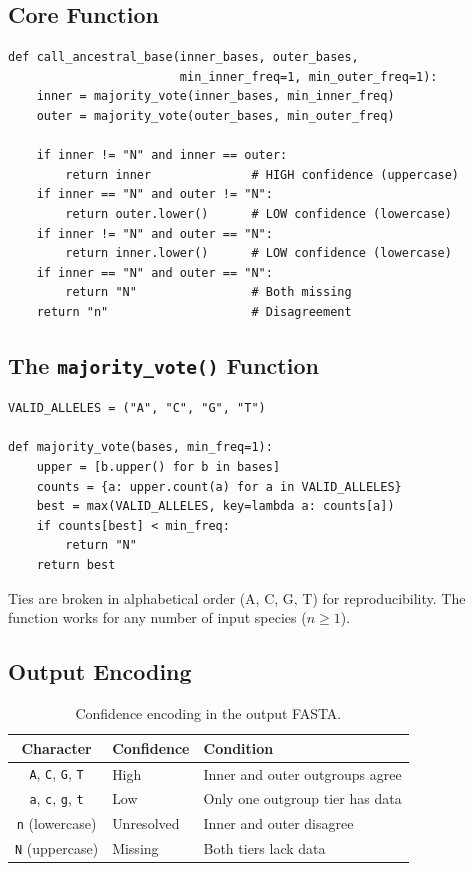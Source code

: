 \documentclass[11pt,a4paper]{article}
\begin{document}
\subsection{Core Function}

\begin{lstlisting}[caption={\texttt{call\_ancestral\_base()} from \texttt{ancestral.py}.}]
def call_ancestral_base(inner_bases, outer_bases,
                        min_inner_freq=1, min_outer_freq=1):
    inner = majority_vote(inner_bases, min_inner_freq)
    outer = majority_vote(outer_bases, min_outer_freq)

    if inner != "N" and inner == outer:
        return inner              # HIGH confidence (uppercase)
    if inner == "N" and outer != "N":
        return outer.lower()      # LOW confidence (lowercase)
    if inner != "N" and outer == "N":
        return inner.lower()      # LOW confidence (lowercase)
    if inner == "N" and outer == "N":
        return "N"                # Both missing
    return "n"                    # Disagreement
\end{lstlisting}

\subsection{The \texttt{majority\_vote()} Function}

\begin{lstlisting}[caption={\texttt{majority\_vote()} from \texttt{utils.py}.}]
VALID_ALLELES = ("A", "C", "G", "T")

def majority_vote(bases, min_freq=1):
    upper = [b.upper() for b in bases]
    counts = {a: upper.count(a) for a in VALID_ALLELES}
    best = max(VALID_ALLELES, key=lambda a: counts[a])
    if counts[best] < min_freq:
        return "N"
    return best
\end{lstlisting}

Ties are broken in alphabetical order (A, C, G, T) for reproducibility.  The function works for any number of input species ($n \geq 1$).

\subsection{Output Encoding}

\begin{table}[H]
\centering
\caption{Confidence encoding in the output FASTA.}
\label{tab:encoding}
\begin{tabular}{cll}
\toprule
\textbf{Character} & \textbf{Confidence} & \textbf{Condition} \\
\midrule
\texttt{A}, \texttt{C}, \texttt{G}, \texttt{T} & High & Inner and outer outgroups agree \\
\texttt{a}, \texttt{c}, \texttt{g}, \texttt{t} & Low & Only one outgroup tier has data \\
\texttt{n} (lowercase) & Unresolved & Inner and outer disagree \\
\texttt{N} (uppercase) & Missing & Both tiers lack data \\
\bottomrule
\end{tabular}
\end{table}
\end{document}
